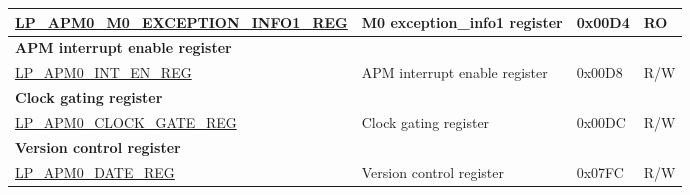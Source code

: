 \begin{longtable}{ | p{6.2cm} | p{6.2cm} | p{2.2cm} | p{1cm} | }
\hyperref[regdesc:LPAPM0M0EXCEPTIONINFO1REG]{LP\_APM0\_M0\_EXCEPTION\_INFO1\_REG} & M0 exception\_info1 register & 0x00D4 & RO \\ \hline
\multicolumn{4}{|l|}{\textbf{APM interrupt enable register}} \\ \hline
\hyperref[regdesc:LPAPM0INTENREG]{LP\_APM0\_INT\_EN\_REG} & APM interrupt enable register & 0x00D8 & R/W \\ \hline
\multicolumn{4}{|l|}{\textbf{Clock gating register}} \\ \hline
\hyperref[regdesc:LPAPM0CLOCKGATEREG]{LP\_APM0\_CLOCK\_GATE\_REG} & Clock gating register & 0x00DC & R/W \\ \hline
\multicolumn{4}{|l|}{\textbf{Version control register}} \\ \hline
\hyperref[regdesc:LPAPM0DATEREG]{LP\_APM0\_DATE\_REG} & Version control register & 0x07FC & R/W \\ \hline
\end{longtable}
